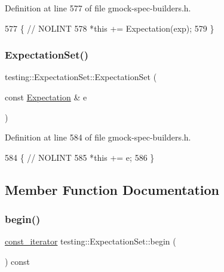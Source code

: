 Definition at line 577 of file gmock-\/spec-\/builders.\+h.


\begin{DoxyCode}
577                                                \{  \textcolor{comment}{// NOLINT}
578     *\textcolor{keyword}{this} += Expectation(exp);
579   \}
\end{DoxyCode}
\mbox{\label{classtesting_1_1ExpectationSet_a2ab7f20951509d1358782093f3b7a25b}} 
\subsubsection{\texorpdfstring{Expectation\+Set()}{ExpectationSet()}\hspace{0.1cm}{\footnotesize\ttfamily [3/3]}}
{\footnotesize\ttfamily testing\+::\+Expectation\+Set\+::\+Expectation\+Set (\begin{DoxyParamCaption}\item[{const \hyperlink{classtesting_1_1Expectation}{Expectation} \&}]{e }\end{DoxyParamCaption})\hspace{0.3cm}{\ttfamily [inline]}}



Definition at line 584 of file gmock-\/spec-\/builders.\+h.


\begin{DoxyCode}
584                                        \{  \textcolor{comment}{// NOLINT}
585     *\textcolor{keyword}{this} += e;
586   \}
\end{DoxyCode}


\subsection{Member Function Documentation}
\mbox{\label{classtesting_1_1ExpectationSet_ad7b8b900ef3f3e35a5d93aecd452504c}} 
\subsubsection{\texorpdfstring{begin()}{begin()}}
{\footnotesize\ttfamily \hyperlink{classtesting_1_1ExpectationSet_ab269a45f80d8c4f747b29de454a084bb}{const\+\_\+iterator} testing\+::\+Expectation\+Set\+::begin (\begin{DoxyParamCaption}{ }\end{DoxyParamCaption}) const\hspace{0.3cm}{\ttfamily [inline]}}



